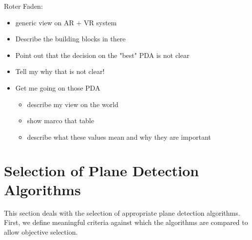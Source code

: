 \documentclass[main.tex]{subfiles}
\begin{document}






Roter Faden:
\begin{itemize}
    \item generic view on AR + VR system
    \item Describe the building blocks in there
    \item Point out that the decision on the "best" PDA is not clear
    \item Tell my why that is not clear!
    \item Get me going on those PDA
          \begin{itemize}
              \item describe my view on the world
              \item show marco that table
              \item describe what these values mean and why they are important
          \end{itemize}
\end{itemize}

\section{Selection of Plane Detection Algorithms}\label{sec:pdaselection}
This section deals with the selection of appropriate plane detection algorithms.
First, we define meaningful criteria against which the algorithms are compared to allow objective selection.
\end{document}
